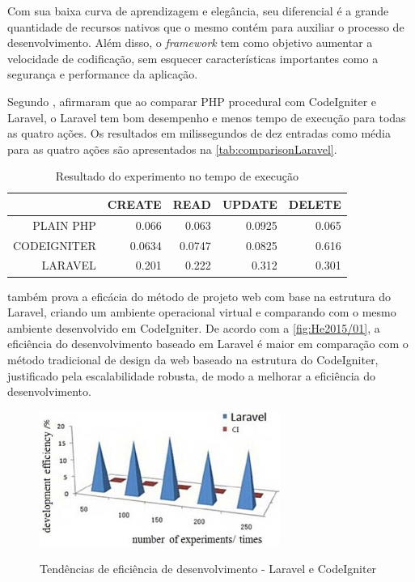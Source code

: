 Com sua baixa curva de aprendizagem e elegância, seu diferencial é a grande quantidade de recursos nativos que o mesmo contém para auxiliar o processo de desenvolvimento. Além disso, o \textit{framework} tem como objetivo aumentar a velocidade de codificação, sem esquecer características importantes como a segurança e performance da aplicação.

Segundo , afirmaram que ao comparar PHP procedural com CodeIgniter e Laravel, o Laravel tem bom desempenho e menos tempo de execução para todas as quatro ações. Os resultados em milissegundos de dez entradas como média para as quatro ações são apresentados na \autoref{tab:comparisonLaravel}.

\begin{table}[H]
    \centering
    \caption{Resultado do experimento no tempo de execução
    \label{tab:comparisonLaravel}}
    \begin{tabular}{|r|r|r|r|r|}
            \hline
            & CREATE    & READ      & UPDATE    & DELETE \\ \hline
            PLAIN PHP   & 0.066     & 0.063    & 0.0925   & 0.065 \\ \hline
            CODEIGNITER & 0.0634    & 0.0747   & 0.0825   & 0.616 \\ \hline
            LARAVEL     & 0.201     & 0.222    & 0.312    & 0.301 \\ \hline
    \end{tabular}
\end{table}

 também prova a eficácia do método de projeto web com base na estrutura do Laravel, criando um ambiente operacional virtual e comparando com o mesmo ambiente desenvolvido em CodeIgniter. De acordo com a \autoref{fig:He2015/01}, a eficiência do desenvolvimento baseado em Laravel é maior em comparação com o método tradicional de design da web baseado na estrutura do CodeIgniter, justificado pela escalabilidade robusta, de modo a melhorar a eficiência do desenvolvimento.

\begin{figure}[H]
    \centering
    \caption{Tendências de eficiência de desenvolvimento - Laravel e CodeIgniter}
    \includegraphics[width=0.7\textwidth]{./dados/figuras/fig9}
    \label{fig:He2015/01}
\end{figure}

